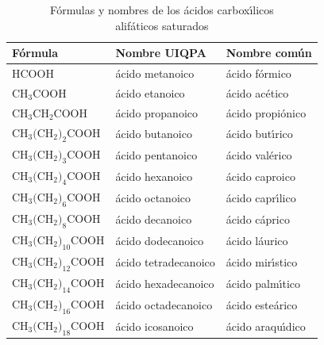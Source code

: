 \begin{table}[bht]
\caption[\'acidos carbox\'{\i}licos]{F\'ormulas y nombres de los \'acidos
carbox\'{\i}licos\\ alif\'aticos saturados}
\label{grasos}
{\small \begin{tabular}{lll}\hline
\textbf{F\'ormula}&\textbf{Nombre UIQPA}& \textbf{Nombre com\'un}\\ \hline
HCOOH                 &\'acido metanoico      &\'acido f\'ormico\\
CH$_3$COOH            &\'acido etanoico       &\'acido ac\'etico\\
CH$_3$CH$_2$COOH      &\'acido propanoico      &\'acido propi\'onico\\
CH$_3($CH$_2)_2$COOH &\'acido butanoico      &\'acido but\'{\i}rico\\
CH$_3($CH$_2)_3$COOH &\'acido pentanoico     &\'acido val\'erico\\
CH$_3($CH$_2)_4$COOH &\'acido hexanoico      &\'acido caproico\\
CH$_3($CH$_2)_6$COOH &\'acido octanoico      &\'acido capr\'{\i}lico\\
CH$_3($CH$_2)_8$COOH &\'acido decanoico      &\'acido c\'aprico\\
CH$_3($CH$_2)_{10}$COOH&\'acido dodecanoico    &\'acido l\'aurico\\
CH$_3($CH$_2)_{12}$COOH&\'acido tetradecanoico &\'acido mir\'{\i}stico\\
CH$_3($CH$_2)_{14}$COOH&\'acido hexadecanoico  &\'acido palm\'{\i}tico\\
CH$_3($CH$_2)_{16}$COOH&\'acido octadecanoico  &\'acido este\'arico\\
CH$_3($CH$_2)_{18}$COOH&\'acido icosanoico     &\'acido araqu\'{\i}dico\\\hline
\end{tabular}}
\end{table}

